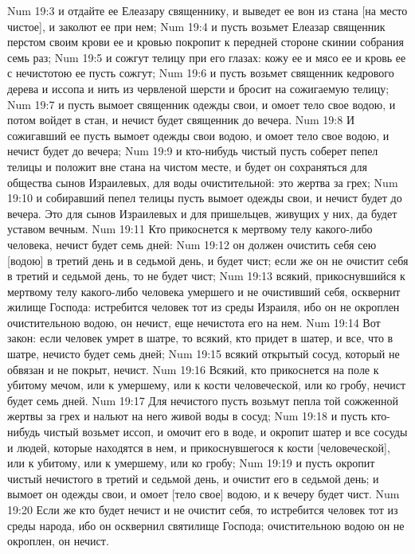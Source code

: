 \vs Num 19:3 и отдайте ее Елеазару священнику, и выведет ее вон из стана [на место чистое], и заколют ее при нем;
\vs Num 19:4 и пусть возьмет Елеазар священник перстом своим крови ее и кровью покропит к передней стороне скинии собрания семь раз;
\vs Num 19:5 и сожгут телицу при его глазах: кожу ее и мясо ее и кровь ее с нечистотою ее пусть сожгут;
\vs Num 19:6 и пусть возьмет священник кедрового дерева и иссопа и нить из червленой шерсти и бросит на сожигаемую телицу;
\vs Num 19:7 и пусть вымоет священник одежды свои, и омоет тело свое водою, и потом войдет в стан, и нечист будет священник до вечера.
\vs Num 19:8 И сожигавший ее пусть вымоет одежды свои водою, и омоет тело свое водою, и нечист будет до вечера;
\vs Num 19:9 и кто-нибудь чистый пусть соберет пепел телицы и положит вне стана на чистом месте, и будет он сохраняться для общества сынов Израилевых, для воды очистительной: это жертва за грех;
\vs Num 19:10 и собиравший пепел телицы пусть вымоет одежды свои, и нечист будет до вечера. Это для сынов Израилевых и для пришельцев, живущих у них, да будет уставом вечным.
\vs Num 19:11 Кто прикоснется к мертвому телу какого-либо человека, нечист будет семь дней:
\vs Num 19:12 он должен очистить себя сею [водою] в третий день и в седьмой день, и будет чист; если же он не очистит себя в третий и седьмой день, то не будет чист;
\vs Num 19:13 всякий, прикоснувшийся к мертвому телу какого-либо человека умершего и не очистивший себя, осквернит жилище Господа: истребится человек тот из среды Израиля, ибо он не окроплен очистительною водою, он нечист, еще нечистота его на нем.
\vs Num 19:14 Вот закон: если человек умрет в шатре, то всякий, кто придет в шатер, и все, что в шатре, нечисто будет семь дней;
\vs Num 19:15 всякий открытый сосуд, который не обвязан и не покрыт, нечист.
\vs Num 19:16 Всякий, кто прикоснется на поле к убитому мечом, или к умершему, или к кости человеческой, или ко гробу, нечист будет семь дней.
\vs Num 19:17 Для нечистого пусть возьмут пепла той сожженной жертвы за грех и нальют на него живой воды в сосуд;
\vs Num 19:18 и пусть кто-нибудь чистый возьмет иссоп, и омочит его в воде, и окропит шатер и все сосуды и людей, которые находятся в нем, и прикоснувшегося к кости [человеческой], или к убитому, или к умершему, или ко гробу;
\vs Num 19:19 и пусть окропит чистый нечистого в третий и седьмой день, и очистит его в седьмой день; и вымоет он одежды свои, и омоет [тело свое] водою, и к вечеру будет чист.
\vs Num 19:20 Если же кто будет нечист и не очистит себя, то истребится человек тот из среды народа, ибо он осквернил святилище Господа; очистительною водою он не окроплен, он нечист.
